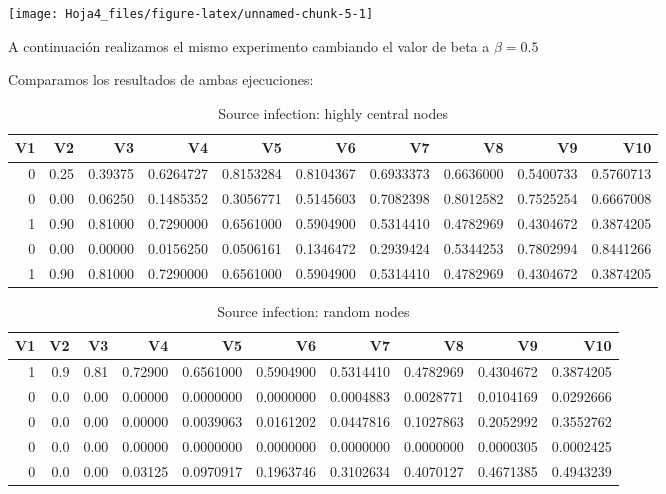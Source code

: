 \documentclass[
]{article}
\begin{document}
\begin{center}\texttt{[image: Hoja4\_files/figure-latex/unnamed-chunk-5-1]} \end{center}

A continuación realizamos el mismo experimento cambiando el valor de
beta a \(\beta = 0.5\)

Comparamos los resultados de ambas ejecuciones:

\begin{table}[!h]

\caption{\label{tab:unnamed-chunk-8}Source infection: highly central nodes}
\centering
\fontsize{7}{9}\selectfont
\begin{tabular}[t]{rrrrrrrrrr}
\toprule
V1 & V2 & V3 & V4 & V5 & V6 & V7 & V8 & V9 & V10\\
\midrule
0 & 0.25 & 0.39375 & 0.6264727 & 0.8153284 & 0.8104367 & 0.6933373 & 0.6636000 & 0.5400733 & 0.5760713\\
0 & 0.00 & 0.06250 & 0.1485352 & 0.3056771 & 0.5145603 & 0.7082398 & 0.8012582 & 0.7525254 & 0.6667008\\
1 & 0.90 & 0.81000 & 0.7290000 & 0.6561000 & 0.5904900 & 0.5314410 & 0.4782969 & 0.4304672 & 0.3874205\\
0 & 0.00 & 0.00000 & 0.0156250 & 0.0506161 & 0.1346472 & 0.2939424 & 0.5344253 & 0.7802994 & 0.8441266\\
1 & 0.90 & 0.81000 & 0.7290000 & 0.6561000 & 0.5904900 & 0.5314410 & 0.4782969 & 0.4304672 & 0.3874205\\
\bottomrule
\end{tabular}
\end{table}

\begin{table}[!h]

\caption{\label{tab:unnamed-chunk-8}Source infection: random nodes}
\centering
\fontsize{7}{9}\selectfont
\begin{tabular}[t]{rrrrrrrrrr}
\toprule
V1 & V2 & V3 & V4 & V5 & V6 & V7 & V8 & V9 & V10\\
\midrule
1 & 0.9 & 0.81 & 0.72900 & 0.6561000 & 0.5904900 & 0.5314410 & 0.4782969 & 0.4304672 & 0.3874205\\
0 & 0.0 & 0.00 & 0.00000 & 0.0000000 & 0.0000000 & 0.0004883 & 0.0028771 & 0.0104169 & 0.0292666\\
0 & 0.0 & 0.00 & 0.00000 & 0.0039063 & 0.0161202 & 0.0447816 & 0.1027863 & 0.2052992 & 0.3552762\\
0 & 0.0 & 0.00 & 0.00000 & 0.0000000 & 0.0000000 & 0.0000000 & 0.0000000 & 0.0000305 & 0.0002425\\
0 & 0.0 & 0.00 & 0.03125 & 0.0970917 & 0.1963746 & 0.3102634 & 0.4070127 & 0.4671385 & 0.4943239\\
\bottomrule
\end{tabular}
\end{table}
\end{document}
